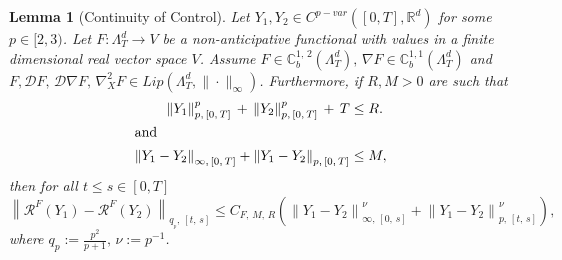 \documentclass[10pt]{amsart}
\newtheorem{lemm}[theo]{Lemma}\newtheorem{prop}[theo]{Proposition}\newtheorem{coro}[theo]{Corollary}\newtheorem{conj}[theo]{Conjecture}
\theoremstyle{definition}\newtheorem{defi}[theo]{Definition}\newtheorem{rema}[theo]{Remark}\newtheorem{exam}[theo]{Example}\newtheorem{exem}[theo]{Example}\newtheorem{nota}[theo]{Notation}
\newcommand{\bbC}{\mathbb{C}}
\newcommand{\calD}{\mathcal{D}}
\newcommand{\calR}{\mathcal{R}}
\newcommand{\Rr}{{\mathbb{R}}}
\begin{document}
\begin{lemm}[Continuity of Control]\label{chp3theorem:contrcont}
Let $Y_1, Y_2\in C^{p-var}([0,T],\Rr^d)$ for some $p\in [2, 3)$. Let $F\colon \Lambda^d_T\to V$ be a non-anticipative functional with values in a finite dimensional real vector space $V$. Assume $ F\in \bbC^{1,\,2}_b(\Lambda^d_T),\, \nabla F\in \bbC^{1,1}_b(\Lambda^d_T)$ and $F, \calD F,\, \calD\nabla F,\, \nabla^2_{X} F\in Lip(\Lambda^d_T, \|\cdot\|_{\infty})$. Furthermore, if $R, M>0$ are such that
\begin{align*}
\left\|Y_1\right\|^p_{p,\,[0,\,T]}\,+\,\left\|Y_2\right\|^p_{p,\,[0,\,T]}\,+\,T&\leq R.
\\
\intertext{and}
\left\|Y_1-Y_2\right\|_{\infty,\,[0,\,T]}+\left\|Y_1-Y_2\right\|_{p,\,[0,\,T]}&\leq M,
\end{align*}
then for all $t\leq s\in[0,T]$
\[
\left\|\calR^{F}(Y_1)-\calR^{F}(Y_2)\right\|_{q_{_p},\,[t,\,s]}\leq C_{F,\,M,\,R}\left(\left\|Y_1-Y_2\right\|^{\nu}_{\infty,\,[0,\,s]}+\left\|Y_1-Y_2\right\|_{p,\,[t,\,s]}^{\nu}\right),
\]
where $q_p:=\frac {p^2} {p+1},\, \nu:=p^{-1}$.
\end{lemm}
\end{document}
